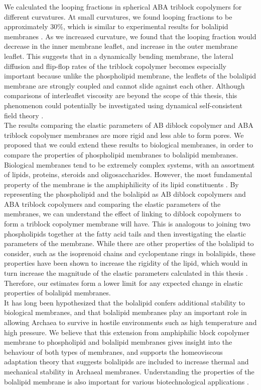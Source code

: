 \documentclass[twocolumn,aps,floatfix,nobibnotes]{revtex4-1}
\begin{document}
\indent We calculated the looping fractions in spherical ABA triblock copolymers for different curvatures. At small curvatures, we found looping fractions to be approximately 30$\%$, which is similar to experimental results for bolalipid membranes \cite{thompson1992tetraether,brownholland2009phase,holland2008bolalipid}. As we increased curvature, we found that the looping fraction would decrease in the inner membrane leaflet, and increase in the outer membrane leaflet. This suggests that in a dynamically bending membrane, the lateral diffusion and flip-flop rates of the triblock copolymer becomes especially important because unlike the phospholipid membrane, the leaflets of the bolalipid membrane are strongly coupled and cannot slide against each other. Although comparisons of interleaflet viscosity are beyond the scope of this thesis, this phenomenon could potentially be investigated using dynamical self-consistent field theory \cite{grzetic2014statistical}.\\
\indent The results comparing the  elastic parameters of AB diblock copolymer and ABA triblock copolymer membranes are more rigid and less able to form pores. We proposed that we could extend these results to biological membranes, in order to compare the properties of phospholipid membranes to bolalipid membranes. Biological membranes tend to be extremely complex systems, with an assortment of lipids, proteins, steroids and oligosaccharides. However, the most fundamental property of the membrane is the amphiphilicity of its lipid constituents \cite{singer1972fluid}. By representing the phospholipid and the bolalipid as AB diblock copolymers and ABA triblock copolymers and comparing the elastic parameters of the membranes, we can understand the effect of linking to diblock copolymers to form a triblock copolymer membrane will have. This is analogous to joining two phospholipids together at the fatty acid tails and then investigating the elastic parameters of the membrane. While there are other properties of the bolalipid to consider, such as the isoprenoid chains and cyclopentane rings in bolalipids, these properties have been shown to increase the rigidity of the lipid, which would in turn increase the magnitude of the elastic parameters calculated in this thesis \cite{bulacu2011silico,chugunov2014liquid}. Therefore, our estimates form a lower limit for any expected change in elastic properties of bolalipid membranes. \\
\indent It has long been hypothesized that the bolalipid confers additional stability to biological membranes, and that bolalipid membranes play an important role in allowing Archaea to survive in hostile environments such as high temperature and high pressure. We believe that this extension from amphiphilic block copolymer membrane to phospholipid and bolalipid membranes gives insight into the behaviour of both types of membranes, and supports the homeoviscous adaptation theory that suggests bolalipids are included to increase thermal and mechanical stability in Archaeal membranes. Understanding the properties of the bolalipid membrane is also important for various biotechnological applications \cite{jacquemet2009archaeal,bulacu2011silico,de2014cell}.\\
\end{document}
